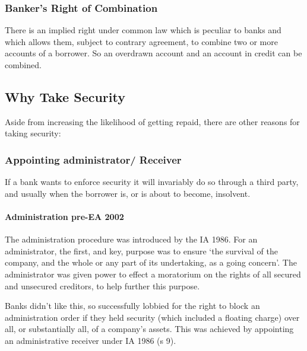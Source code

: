 \documentclass[
]{article}
\begin{document}
\hypertarget{bankers-right-of-combination}{%
\subsubsection{Banker's Right of
Combination}\label{bankers-right-of-combination}}

There is an implied right under common law which is peculiar to banks
and which allows them, subject to contrary agreement, to combine two or
more accounts of a borrower. So an overdrawn account and an account in
credit can be combined.

\hypertarget{why-take-security}{%
\subsection{Why Take Security}\label{why-take-security}}

Aside from increasing the likelihood of getting repaid, there are other
reasons for taking security:

\hypertarget{appointing-administrator-receiver}{%
\subsubsection{Appointing administrator/
Receiver}\label{appointing-administrator-receiver}}

If a bank wants to enforce security it will invariably do so through a
third party, and usually when the borrower is, or is about to become,
insolvent.

\hypertarget{administration-pre-ea-2002}{%
\paragraph{Administration pre-EA
2002}\label{administration-pre-ea-2002}}

The administration procedure was introduced by the IA 1986. For an
administrator, the first, and key, purpose was to ensure `the survival
of the company, and the whole or any part of its undertaking, as a going
concern'. The administrator was given power to effect a moratorium on
the rights of all secured and unsecured creditors, to help further this
purpose.

Banks didn't like this, so successfully lobbied for the right to block
an administration order if they held security (which included a floating
charge) over all, or substantially all, of a company's assets. This was
achieved by appointing an administrative receiver under IA 1986 (s 9).
\end{document}
